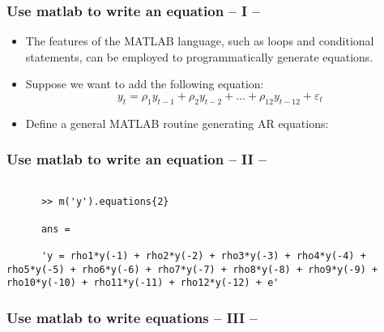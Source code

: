 \documentclass[10pt,slidestop]{beamer}
\theoremstyle{plain}
\begin{document}
\begin{frame}[c,fragile]
  \frametitle{Use matlab to write an equation -- I --}

  \begin{itemize}

  \item The features of the MATLAB language, such as loops and conditional statements, can be employed to programmatically generate equations.\newline

  \item Suppose we want to add the following equation:
    \[
      y_t = \rho_1 y_{t-1} + \rho_2 y_{t-2} + \dots + \rho_{12} y_{t-12} + \varepsilon_t
    \]

    \medskip

  \item Define a general MATLAB routine generating AR equations:\newline

    

  \end{itemize}

\end{frame}


\begin{frame}[c,fragile]
  \frametitle{Use matlab to write an equation -- II --}

  

  \bigskip

  \begin{lstlisting}[style=MatlabConsole]

      >> m('y').equations{2}

      ans =

      'y = rho1*y(-1) + rho2*y(-2) + rho3*y(-3) + rho4*y(-4) + rho5*y(-5) + rho6*y(-6) + rho7*y(-7) + rho8*y(-8) + rho9*y(-9) + rho10*y(-10) + rho11*y(-11) + rho12*y(-12) + e'
  \end{lstlisting}

\end{frame}


\begin{frame}[c,fragile]
  \frametitle{Use matlab to write equations -- III --}

  

\end{frame}
\end{document}

